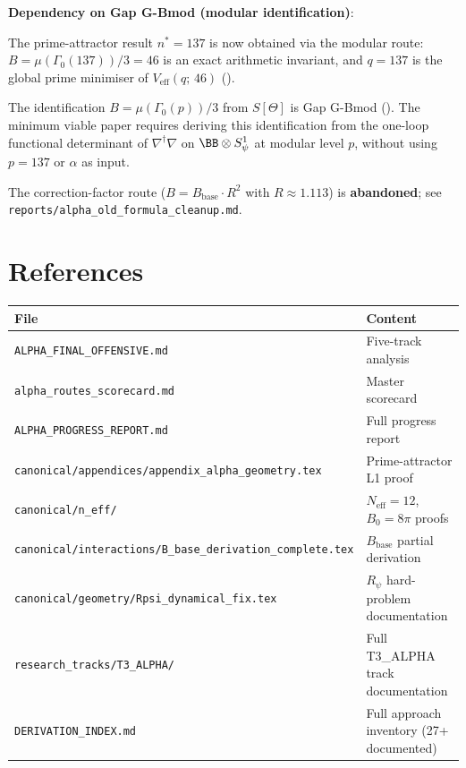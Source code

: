 \documentclass[12pt,a4paper]{article}
\theoremstyle{definition}
\theoremstyle{remark}
\begin{document}
\noindent\textbf{Dependency on Gap G-Bmod (modular identification)}:

The prime-attractor result $n^* = 137$ is now obtained via the modular route:
$B = \mu(\Gamma_0(137))/3 = 46$ is an exact arithmetic invariant, and $q = 137$
is the global prime minimiser of $V_{\mathrm{eff}}(q;\,46)$ (\Lzero).

\begin{warnbox}
The identification $B = \mu(\Gamma_0(p))/3$ from $S[\Theta]$ is Gap G-Bmod
(\OPEN).  The minimum viable paper requires deriving this identification
from the one-loop functional determinant of $\nabla^\dagger\nabla$ on
$\BB \otimes S^1_\psi$ at modular level $p$, without using $p = 137$ or
$\alpha$ as input.

The correction-factor route ($B = B_{\mathrm{base}} \cdot R^2$ with
$R \approx 1.113$) is \textbf{abandoned}; see
\texttt{reports/alpha\_old\_formula\_cleanup.md}.
\end{warnbox}

\section{References}
\label{sec:bc:refs}

\begin{center}
\begin{tabular}{ll}
\toprule
File & Content \\
\midrule
\texttt{ALPHA\_FINAL\_OFFENSIVE.md} & Five-track analysis \\
\texttt{alpha\_routes\_scorecard.md} & Master scorecard \\
\texttt{ALPHA\_PROGRESS\_REPORT.md} & Full progress report \\
\texttt{canonical/appendices/appendix\_alpha\_geometry.tex} & Prime-attractor L1 proof \\
\texttt{canonical/n\_eff/} & $N_{\mathrm{eff}} = 12$, $B_0 = 8\pi$ proofs \\
\texttt{canonical/interactions/B\_base\_derivation\_complete.tex} & $B_{\mathrm{base}}$ partial derivation \\
\texttt{canonical/geometry/Rpsi\_dynamical\_fix.tex} & $R_\psi$ hard-problem documentation \\
\texttt{research\_tracks/T3\_ALPHA/} & Full T3\_ALPHA track documentation \\
\texttt{DERIVATION\_INDEX.md} & Full approach inventory (27+ documented) \\
\bottomrule
\end{tabular}
\end{center}

\ifdefined\INCLUDEMODE
\else
  
\end{document}
